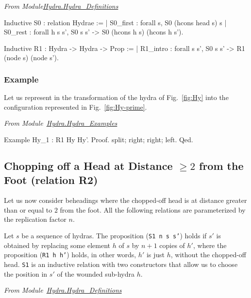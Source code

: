 \vspace{4pt}\emph{From Module\href{../theories/html/hydras.Hydra.Hydra_Definitions.html}{Hydra.Hydra\_Definitions}}

\begin{Coqsrc}
Inductive S0 :  relation Hydrae :=
| S0_first : forall s, S0  (hcons head s) s
| S0_rest : forall  h s s',  S0  s s' ->
                             S0  (hcons h s) (hcons h s').

Inductive R1  :  Hydra -> Hydra -> Prop :=
| R1_intro : forall s s', S0 s s' -> R1 (node s) (node s').
\end{Coqsrc}

\subsubsection{Example}
\label{sec:orgheadline45}

Let us represent in \coq{}   the transformation of the hydra of Fig.~\vref{fig:Hy} into
the configuration represented in Fig.~\ref{fig:Hy-prime}.

\vspace{4pt}
\emph{From Module~\href{../theories/html/hydras.Hydra.Hydra_Examples.html}{Hydra.Hydra\_Examples}}


\begin{Coqsrc}
Example Hy_1 : R1 Hy Hy'.
Proof. 
  split; right; right; left.
Qed.
\end{Coqsrc}


\subsection{Chopping off a Head at Distance \texorpdfstring{$\geq 2$}{>= 2} from the Foot (relation R2) }


Let us now consider beheadings  where the chopped-off head is at distance greater than or equal to $2$ from the foot. All the following relations are parameterized by the replication factor  $n$.

 Let $s$ be a sequence of hydras. 
The proposition (\texttt{S1 n s s'}) holds if $s'$ is obtained by replacing some element $h$ of $s$ by 
$n+1$ copies of $h'$, where  the proposition (\texttt{R1 h h'}) holds, in other words, $h'$ is just $h$, without the chopped-off  head. \texttt{S1} is an inductive relation with two constructors that allow us to choose the position in $s'$ of the wounded sub-hydra $h$.

\vspace{4pt}
\noindent
\emph{From Module~\href{../theories/html/hydras.Hydra.Hydra_Definitions.html\#S1}{Hydra.Hydra\_Definitions}}

